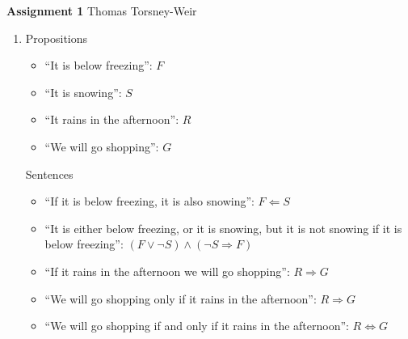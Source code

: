 \documentclass[10pt]{article}
\begin{document}
{\bf Assignment 1} \hfill {\raggedleft Thomas Torsney-Weir}

\begin{enumerate}
\item %
  Propositions
  \begin{itemize}
  \item ``It is below freezing'': $F$
  \item ``It is snowing'': $S$
  \item ``It rains in the afternoon'': $R$
  \item ``We will go shopping'': $G$
  \end{itemize}

  Sentences
  \begin{itemize}
  \item ``If it is below freezing, it is also snowing'': $F \Leftarrow S$
  \item ``It is either below freezing, or it is snowing, 
          but it is not snowing if it is below freezing'': 
        $(F \lor \neg S) \land (\neg S \Rightarrow F)$
  \item ``If it rains in the afternoon we will go shopping'': $R \Rightarrow G$
  \item ``We will go shopping only if it rains in the afternoon'':
        $R \Rightarrow G$
  \item ``We will go shopping if and only if it rains in the afternoon'':
        $R \Leftrightarrow G$
  \end{itemize}


\end{enumerate}
\end{document}
